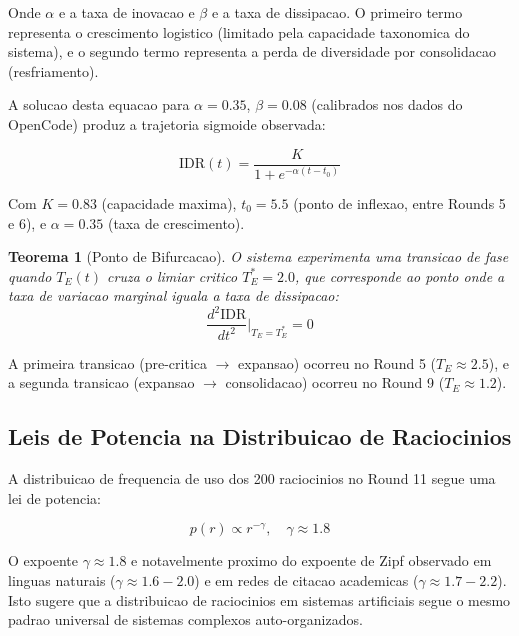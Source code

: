 \documentclass[5p]{elsarticle}
\newtheorem{theorem}{Teorema}[section]
\begin{document}
Onde $\alpha$ e a taxa de inovacao e $\beta$ e a taxa de dissipacao.
O primeiro termo representa o crescimento logistico (limitado pela capacidade
taxonomica do sistema), e o segundo termo representa a perda de diversidade
por consolidacao (resfriamento).

A solucao desta equacao para $\alpha = 0.35$, $\beta = 0.08$ (calibrados
nos dados do OpenCode) produz a trajetoria sigmoide observada:

\begin{equation}
  \text{IDR}(t) = \frac{K}{1 + e^{-\alpha(t - t_0)}}
\end{equation}

Com $K = 0.83$ (capacidade maxima), $t_0 = 5.5$ (ponto de inflexao, entre
Rounds 5 e 6), e $\alpha = 0.35$ (taxa de crescimento).

\begin{theorem}[Ponto de Bifurcacao]
  O sistema experimenta uma transicao de fase quando $T_E(t)$ cruza o limiar
  critico $T_E^* = 2.0$, que corresponde ao ponto onde a taxa de variacao
  marginal iguala a taxa de dissipacao:
  \begin{equation}
    \frac{d^2 \text{IDR}}{dt^2}\bigg|_{T_E = T_E^*} = 0
  \end{equation}
\end{theorem}

A primeira transicao (pre-critica $\to$ expansao) ocorreu no Round 5
($T_E \approx 2.5$), e a segunda transicao (expansao $\to$ consolidacao)
ocorreu no Round 9 ($T_E \approx 1.2$).

\subsection{Leis de Potencia na Distribuicao de Raciocinios}

A distribuicao de frequencia de uso dos 200 raciocinios no Round 11 segue
uma lei de potencia:

\begin{equation}
  p(r) \propto r^{-\gamma}, \quad \gamma \approx 1.8
\end{equation}

O expoente $\gamma \approx 1.8$ e notavelmente proximo do expoente de
Zipf observado em linguas naturais ($\gamma \approx 1.6-2.0$) e em
redes de citacao academicas ($\gamma \approx 1.7-2.2$). Isto sugere que
a distribuicao de raciocinios em sistemas artificiais segue o mesmo
padrao universal de sistemas complexos auto-organizados.

\end{document}
